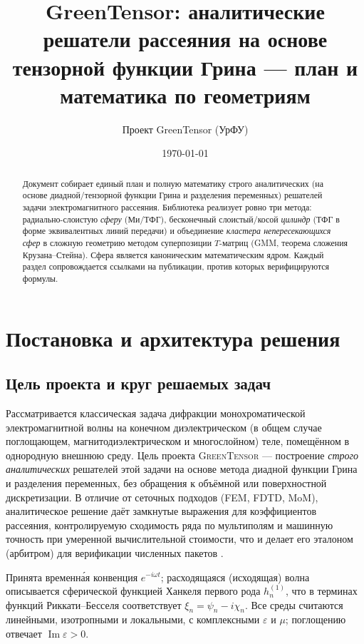 \documentclass[11pt,a4paper]{article}
\title{\textbf{GreenTensor}: аналитические решатели рассеяния на основе\\ тензорной функции Грина --- план и математика по геометриям}
\author{Проект GreenTensor (УрФУ)}
\date{\today}
\begin{document}
\maketitle
\begin{abstract}
\noindent Документ собирает единый план и полную математику строго аналитических (на основе диадной/тензорной функции Грина и разделения переменных) решателей задачи электромагнитного рассеяния. Библиотека реализует ровно три метода: радиально-слоистую \emph{сферу} (Ми/ТФГ), бесконечный слоистый/косой \emph{цилиндр} (ТФГ в форме эквивалентных линий передачи) и объединение \emph{кластера непересекающихся сфер} в сложную геометрию методом суперпозиции $T$-матриц (GMM, теорема сложения Крузана--Стейна). Сфера является каноническим математическим ядром. Каждый раздел сопровождается ссылками на публикации, против которых верифицируются формулы.
\end{abstract}
\tableofcontents
\bigskip

\section{Постановка и архитектура решения}
\label{plan-sec:plan}

\subsection{Цель проекта и круг решаемых задач}

Рассматривается классическая задача дифракции монохроматической электромагнитной волны на конечном диэлектрическом (в общем случае поглощающем, магнитодиэлектрическом и многослойном) теле, помещённом в однородную внешнюю среду. Цель проекта \textsc{GreenTensor} --- построение \emph{строго аналитических} решателей этой задачи на основе метода диадной функции Грина и разделения переменных, без обращения к объёмной или поверхностной дискретизации. В отличие от сеточных подходов (FEM, FDTD, MoM), аналитическое решение даёт замкнутые выражения для коэффициентов рассеяния, контролируемую сходимость ряда по мультиполям и машинную точность при умеренной вычислительной стоимости, что и делает его эталоном (арбитром) для верификации численных пакетов \cite{bohren1983,mishchenko2002}.

Принята временн\'{а}я конвенция $e^{-i\omega t}$; расходящаяся (исходящая) волна описывается сферической функцией Ханкеля первого рода $h_n^{(1)}$, что в терминах функций Риккати--Бесселя соответствует $\xi_n=\psi_n-i\chi_n$. Все среды считаются линейными, изотропными и локальными, с комплексными $\varepsilon$ и $\mu$; поглощению отвечает $\operatorname{Im}\varepsilon>0$.
\end{document}
